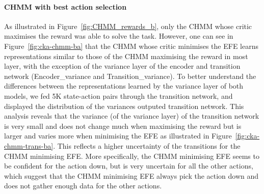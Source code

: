 \documentclass[twoside,11pt]{article}
\begin{document}
\paragraph{CHMM with best action selection}
As illustrated in Figure~\ref{fig:CHMM_rewards_b}, only the CHMM whose critic maximises the reward was able to solve the task. However, one can see in Figure~\ref{fig:cka-chmm-ba} that the CHMM whose critic minimises the EFE learns representations similar to those of the CHMM maximising the reward in most layer, with the exception of the variance layer of the encoder and transition network (Encoder\_variance and Transition\_variance). To better understand the differences between the representations learned by the variance layer of both models, we fed 5K state-action pairs through the transition network, and displayed the distribution of the variances outputed transition network. This analysis reveals that the variance (of the variance layer) of the transition network is very small and does not change much when maximising the reward but is larger and varies more when minimising the EFE as illustrated in Figure~\ref{fig:cka-chmm-trans-ba}. This reflects a higher uncertainty of the transitions for the CHMM minimising EFE. More specifically, the CHMM minimising EFE seems to be confident for the action down, but is very uncertain for all the other actions, which suggest that the CHMM minimising EFE always pick the action down and does not gather enough data for the other actions.
\end{document}
